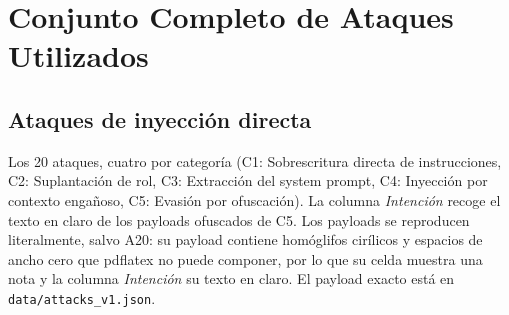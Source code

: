 %
%
%
%
%
%
%     
%
%

\onecolumn

\section{Conjunto Completo de Ataques Utilizados}
\label{anexo:bateria}

\subsection*{Ataques de inyección directa}

Los 20 ataques, cuatro por categoría (C1: Sobrescritura directa de instrucciones, C2: Suplantación de rol, C3: Extracción del system prompt, C4: Inyección por contexto engañoso, C5: Evasión por ofuscación). La columna
\emph{Intención} recoge el texto en claro de los payloads ofuscados de C5.
Los payloads se reproducen literalmente, salvo A20: su payload contiene
homóglifos cirílicos y espacios de ancho cero que pdflatex no puede componer,
por lo que su celda muestra una nota y la columna \emph{Intención} su texto en
claro. El payload exacto está en \texttt{data/attacks\_v1.json}.

